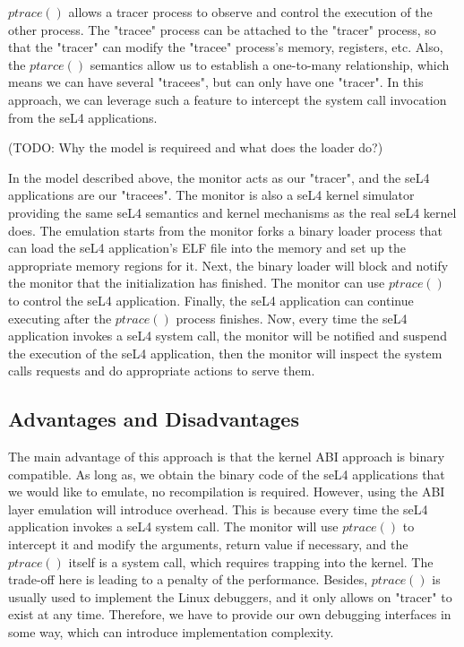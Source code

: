 $ptrace()$ allows a tracer process to observe and control the execution of the other process. The "tracee" process can be attached to the "tracer" process, so that the "tracer" can modify the "tracee" process's memory, registers, etc. Also, the $ptarce()$ semantics allow us to establish a one-to-many relationship, which means we can have several "tracees", but can only have one "tracer". In this approach, we can leverage such a feature to intercept the system call invocation from the seL4 applications.

(TODO: Why the model is requireed and what does the loader do?)

In the model described above, the monitor acts as our "tracer", and the seL4 applications are our "tracees". The monitor is also a seL4 kernel simulator providing the same seL4 semantics and kernel mechanisms as the real seL4 kernel does. The emulation starts from the monitor forks a binary loader process that can load the seL4 application's ELF file into the memory and set up the appropriate memory regions for it. Next, the binary loader will block and notify the monitor that the initialization has finished. The monitor can use $ptrace()$ to control the seL4 application. Finally, the seL4 application can continue executing after the $ptrace()$ process finishes. Now, every time the seL4 application invokes a seL4 system call, the monitor will be notified and suspend the execution of the seL4 application, then the monitor will inspect the system calls requests and do appropriate actions to serve them.

\subsection{Advantages and Disadvantages}
The main advantage of this approach is that the kernel ABI approach is binary compatible. As long as, we obtain the binary code of the seL4 applications that we would like to emulate, no recompilation is required. However, using the ABI layer emulation will introduce overhead. This is because every time the seL4 application invokes a seL4 system call. The monitor will use $ptrace()$ to intercept it and modify the arguments, return value if necessary, and the $ptrace()$ itself is a system call, which requires trapping into the kernel. The trade-off here is leading to a penalty of the performance. Besides, $ptrace()$ is usually used to implement the Linux debuggers, and it only allows on "tracer" to exist at any time. Therefore, we have to provide our own debugging interfaces in some way, which can introduce implementation complexity.  

